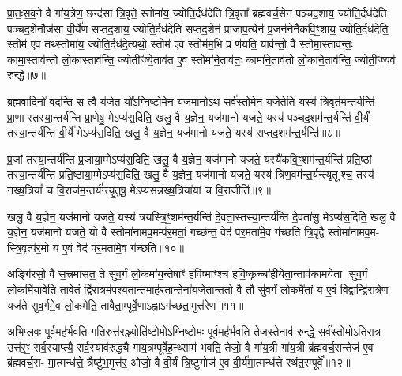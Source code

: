 {\anuvakamend[{अस्थू॑रि॒रोष॑धीषु ज्येष्ठय॒ज्ञ इति॑ बृ॒हद॑नु॒ष्टुप्छन्दः॒ प्रति॑ष्ठिता॒ नव॑ च॥१॥}]}

प्रा॒तः॒स॒व॒ने वै गा॑य॒त्रेण॒ छन्द॑सा त्रि॒वृते॒ स्तोमा॑य॒ ज्योति॒र्दध॑देति त्रि॒वृता᳚ ब्रह्मवर्च॒सेन॑ पञ्चद॒शाय॒ ज्योति॒र्दध॑देति पञ्चद॒शेनौज॑सा वी॒र्ये॑ण सप्तद॒शाय॒ ज्योति॒र्दध॑देति सप्तद॒शेन॑ प्राजाप॒त्येन॑ प्र॒जन॑नेनैकवि॒ꣳ॒शाय॒ ज्योति॒र्दध॑देति॒ स्तोम॑ ए॒व तथ्स्तोमा॑य॒ ज्योति॒र्दध॑दे॒त्यथो॒ स्तोम॑ ए॒व स्तोम॑म॒भि प्र ण॑यति॒ याव॑न्तो॒ वै स्तोमा॒स्ताव॑न्तः॒ कामा॒स्ताव॑न्तो लो॒कास्ताव॑न्ति॒ ज्योतीꣳ॑ष्ये॒ताव॑त ए॒व स्तोमा॑ने॒ताव॑तः॒ कामा॑ने॒ताव॑तो लो॒काने॒ताव॑न्ति॒ ज्योती॒ꣳ॒ष्यव॑ रुन्द्धे॥७॥

{\anuvakamend[{ताव॑न्तो लो॒कास्त्रयो॑दश च॥२॥}]}

ब्र॒ह्म॒वा॒दिनो॑ वदन्ति॒ स त्वै य॑जेत॒ यो᳚\-ऽग्निष्टो॒मेन॒ यज॑मा॒नो\-ऽथ॒ सर्व॑स्तोमेन॒ यजे॒तेति॒ यस्य॑ त्रि॒वृत॑मन्त॒र्यन्ति॑ प्रा॒णास्तस्या॒न्तर्य॑न्ति प्रा॒णेषु॒ मे\-ऽप्य॑स॒दिति॒ खलु॒ वै य॒ज्ञेन॒ यज॑मानो यजते॒ यस्य॑ पञ्चद॒शम॑न्त॒र्यन्ति॑ वी॒र्यं॑ तस्या॒न्तर्य॑न्ति वी॒र्ये॑ मे\-ऽप्य॑स॒दिति॒ खलु॒ वै य॒ज्ञेन॒ यज॑मानो यजते॒ यस्य॑ सप्तद॒शम॑न्त॒र्यन्ति॑॥८॥

प्र॒जां तस्या॒न्तर्य॑न्ति प्र॒जाया॒म्मे\-ऽप्य॑स॒दिति॒ खलु॒ वै य॒ज्ञेन॒ यज॑मानो यजते॒ यस्यै॑कवि॒ꣳ॒शम॑न्त॒र्यन्ति॑ प्रति॒ष्ठां तस्या॒न्तर्य॑न्ति प्रति॒ष्ठाया॒म्मे\-ऽप्य॑स॒दिति॒ खलु॒ वै य॒ज्ञेन॒ यज॑मानो यजते॒ यस्य॑ त्रिण॒वम॑न्त॒र्यन्त्यृ॒तूश्च॒ तस्य॑ नख्ष॒त्रियां᳚ च वि॒राज॑म॒न्तर्य॑न्त्यृ॒तुषु॒ मे\-ऽप्य॑सन्नख्ष॒त्रिया॑यां च वि॒राजीति॑॥९॥

खलु॒ वै य॒ज्ञेन॒ यज॑मानो यजते॒ यस्य॑ त्रयस्त्रि॒ꣳ॒शम॑न्त॒र्यन्ति॑ दे॒वता॒स्तस्या॒न्तर्य॑न्ति दे॒वता॑सु॒ मे\-ऽप्य॑स॒दिति॒ खलु॒ वै य॒ज्ञेन॒ यज॑मानो यजते॒ यो वै स्तोमा॑नामव॒मम्प॑र॒मतां॒ गच्छ॑न्तं॒ वेद॑ पर॒मता॑मे॒व ग॑च्छति त्रि॒वृद्वै स्तोमा॑नामव॒म- स्त्रि॒वृत्प॑र॒मो य ए॒वं वेद॑ पर॒मता॑मे॒व ग॑च्छति॥१०॥

{\anuvakamend[{स॒प्त॒द॒शम॑न्त॒र्यन्ति॑ वि॒राजीति॒ चतु॑श्चत्वारिशच्च॥३॥}]}

अङ्गि॑रसो॒ वै स॒त्त्रमा॑सत॒ ते सु॑व॒र्गं लो॒कमा॑य॒न्तेषाꣳ॑ ह॒विष्माꣳ॑श्च हवि॒ष्कृच्चा॑हीयेता॒न्ताव॑कामयेता सुव॒र्गं लो॒कमि॑या॒वेति॒ तावे॒तं द्वि॑रा॒त्रम॑पश्यता॒न्तमाह॑रता॒न्तेना॑यजेता॒न्ततो॒ वै तौ सु॑व॒र्गं लो॒कमै॑तां॒ य ए॒वं वि॒द्वान्द्वि॑रा॒त्रेण॒ यज॑ते सुव॒र्गमे॒व लो॒कमे॑ति॒ तावैता॒म्पूर्वे॒णा\-ऽह्ना\-ऽग॑च्छता॒मुत्त॑रेण॥११॥

अ॒भि॒प्ल॒वः पूर्व॒मह॑र्भवति॒ गति॒रुत्त॑र॒ञ्ज्योति॑ष्टोमो\-ऽग्निष्टो॒मः पूर्व॒मह॑र्भवति॒ तेज॒स्तेनाव॑ रुन्द्धे॒ सर्व॑स्तोमो\-ऽतिरा॒त्र उत्त॑र॒ꣳ॒ सर्व॒स्याप्त्यै॒ सर्व॒स्याव॑रुद्ध्यै गाय॒त्रम्पूर्वेह॒न्थ्साम॑ भवति॒ तेजो॒ वै गा॑य॒त्री गा॑य॒त्री ब्र॑ह्मवर्च॒सन्तेज॑ ए॒व ब्र॑ह्मवर्च॒स- मा॒त्मन्ध॑त्ते॒ त्रैष्टु॑भ॒मुत्त॑र॒ ओजो॒ वै वी॒र्यं॑ त्रि॒ष्टुगोज॑ ए॒व वी॒र्य॑मा॒त्मन्ध॑त्ते रथंत॒रम्पूर्वे᳚॥१२॥

